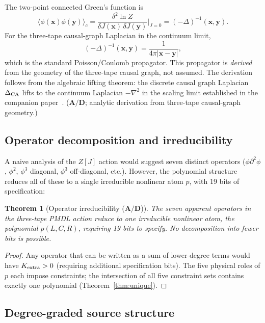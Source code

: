 \documentclass[11pt]{article}
\newtheorem{theorem}{Theorem}[section]
\theoremstyle{remark}
\newcommand{\CatAD}{\textbf{A/D}}
\begin{document}
The two-point connected Green's function is
\[
  \langle\phi(\mathbf{x})\phi(\mathbf{y})\rangle_c
  = \frac{\delta^2\ln Z}{\delta J(\mathbf{x})\,\delta J(\mathbf{y})}\bigg|_{J=0}
  = (-\Delta)^{-1}(\mathbf{x},\mathbf{y}).
\]
For the three-tape causal-graph Laplacian in the continuum limit,
\[
  (-\Delta)^{-1}(\mathbf{x},\mathbf{y}) = \frac{1}{4\pi|\mathbf{x}-\mathbf{y}|},
\]
which is the standard Poisson/Coulomb propagator. This propagator is
\emph{derived} from the geometry of the three-tape causal graph, not assumed.
The derivation follows from the algebraic lifting theorem: the discrete causal
graph Laplacian $\Delta_{\rm CA}$ lifts to the continuum Laplacian $-\nabla^2$
in the scaling limit established in the companion paper~\cite{SpivackThreeTapeCMCA}.
($\CatAD$; analytic derivation from three-tape causal-graph geometry.)

\subsection{Operator decomposition and irreducibility}
\label{ssec:operator}

A naive analysis of the $Z[J]$ action would suggest seven distinct operators
($\phi\partial^2\phi$, $\phi^2$, $\phi^3$ diagonal, $\phi^3$ off-diagonal, etc.).
However, the polynomial structure reduces all of these to a single irreducible
nonlinear atom $p$, with 19 bits of specification:

\begin{theorem}[Operator irreducibility ($\CatAD$)]
The seven apparent operators in the three-tape PMDL action reduce to one
irreducible nonlinear atom, the polynomial $p(L,C,R)$, requiring 19 bits to
specify. No decomposition into fewer bits is possible.
\end{theorem}

\begin{proof}
Any operator that can be written as a sum of lower-degree terms would have
$K_{\rm extra} > 0$ (requiring additional specification bits). The five
physical roles of $p$ each impose constraints; the intersection of all five
constraint sets contains exactly one polynomial (Theorem~\ref{thm:unique}).
\end{proof}

\subsection{Degree-graded source structure}
\label{ssec:degree}
\end{document}
